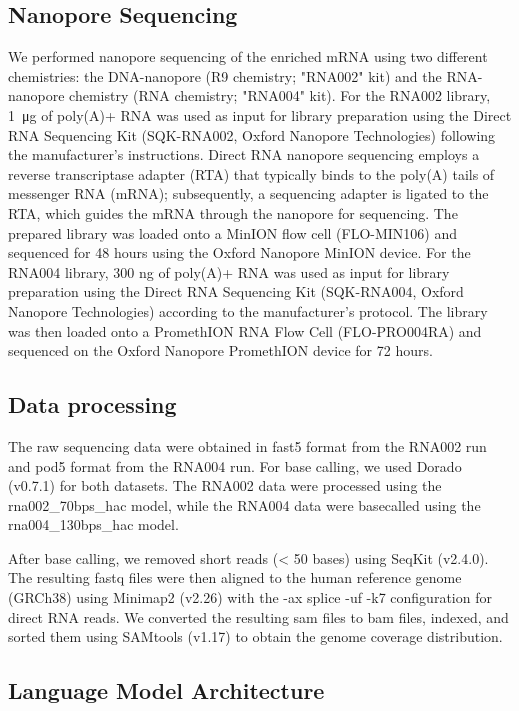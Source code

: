 \documentclass[pdflatex, sn-mathphys-num, lineno]{sn-jnl}%
\theoremstyle{thmstyleone}%
\theoremstyle{thmstyletwo}%
\theoremstyle{thmstylethree}%
\begin{document}
\subsection{Nanopore Sequencing}

We performed nanopore sequencing of the enriched mRNA using two different chemistries: the DNA-nanopore (R9 chemistry; "RNA002" kit) and the RNA-nanopore chemistry (RNA chemistry; "RNA004" kit).
For the RNA002 library, \SI{1}{\micro\gram} of poly(A)+ RNA was used as input for library preparation using the Direct RNA Sequencing Kit (SQK-RNA002, Oxford Nanopore Technologies) following the manufacturer's instructions.
Direct RNA nanopore sequencing employs a reverse transcriptase adapter (RTA) that typically binds to the poly(A) tails of messenger RNA (mRNA); subsequently, a sequencing adapter is ligated to the RTA, which guides the mRNA through the nanopore for sequencing.
The prepared library was loaded onto a MinION flow cell (FLO-MIN106) and sequenced for 48 hours using the Oxford Nanopore MinION device.
For the RNA004 library, 300 ng of poly(A)+ RNA was used as input for library preparation using the Direct RNA Sequencing Kit (SQK-RNA004, Oxford Nanopore Technologies) according to the manufacturer's protocol.
The library was then loaded onto a PromethION RNA Flow Cell (FLO-PRO004RA) and sequenced on the Oxford Nanopore PromethION device for 72 hours.

\subsection{Data processing}

The raw sequencing data were obtained in fast5 format from the RNA002 run and pod5 format from the RNA004 run.
For base calling, we used Dorado (v0.7.1) for both datasets.
The RNA002 data were processed using the rna002\_70bps\_hac model, while the RNA004 data were basecalled using the rna004\_130bps\_hac model.

After base calling, we removed short reads (< 50 bases) using SeqKit (v2.4.0).
The resulting fastq files were then aligned to the human reference genome (GRCh38) using Minimap2 (v2.26) with the -ax splice -uf -k7 configuration for direct RNA reads.
We converted the resulting sam files to bam files, indexed, and sorted them using SAMtools (v1.17) to obtain the genome coverage distribution.

\subsection{Language Model Architecture}\label{ssec:lm}
\end{document}
